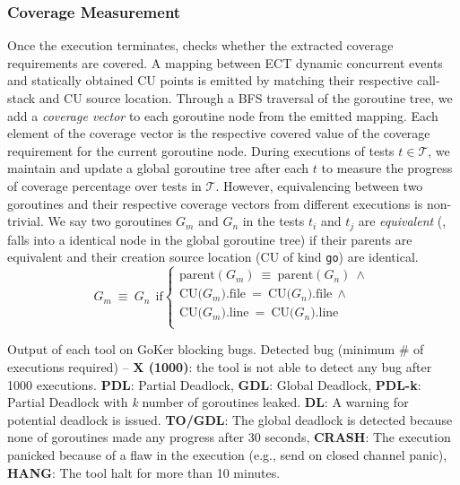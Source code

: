 \subsubsection{Coverage Measurement}
Once the execution terminates, \goat checks whether the extracted coverage requirements are covered.
%
A mapping between ECT dynamic concurrent events and statically obtained CU points is emitted by matching their respective call-stack and CU source location.
%
Through a BFS traversal of the goroutine tree, we add a \textit{coverage vector} to each goroutine node from the emitted mapping.
%
Each element of the coverage vector is the respective covered value of the coverage requirement for the current goroutine node.
%
During executions of tests $t \in \mathcal{T}$, we maintain and update a global goroutine tree after each $t$ to measure the progress of coverage percentage over tests in $\mathcal{T}$.
%
However, equivalencing between two goroutines and their respective coverage vectors from different executions is non-trivial.
%
We say two goroutines $G_m$ and $G_n$ in the tests $t_i$ and $t_j$ are \textit{equivalent} (\ie, falls into a identical node in the global goroutine tree) if their parents are equivalent and their creation source location (CU of kind \texttt{go}) are identical.
%
\begin{equation}
  G_m~\equiv~G_n~~\text{if}
  \begin{cases}
    \text{parent}(G_m)~\equiv~\text{parent}(G_n)~\wedge \\
    \text{CU(}G_m\text{).file}~=~\text{CU(}G_n\text{).file}~\wedge\\
    \text{CU(}G_m\text{).line}~=~\text{CU(}G_n\text{).line}~\\
  \end{cases}
\end{equation}


\begin{table}[]
\caption{Output of each tool on GoKer \cite{yuan-gobench-cgo21} blocking bugs. Detected bug (minimum \# of executions required) -- \textbf{X (1000)}: the tool is not able to detect any bug after 1000 executions. \textbf{PDL}: Partial Deadlock, \textbf{GDL}: Global Deadlock, \textbf{PDL-k}: Partial Deadlock with \textit{k} number of goroutines leaked. \textbf{DL}: A warning for potential deadlock is issued. \textbf{TO/GDL}: The global deadlock is detected because none of goroutines made any progress after 30 seconds, \textbf{CRASH}: The execution panicked because of a flaw in the execution (e.g., send on closed channel panic), \textbf{HANG}: The tool halt for more than 10 minutes.}
\centering
\scalebox{0.72}{
    
  }
\label{tab:comparison}
\end{table}
